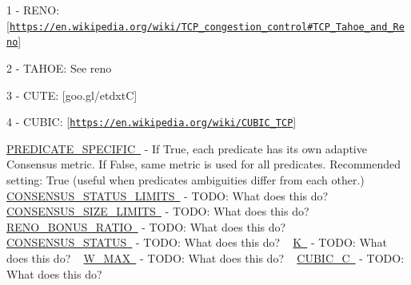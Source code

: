\begin{DoxyItemize}
\item 1 -\/ R\+E\+NO\+: \mbox{[}\href{https://en.wikipedia.org/wiki/TCP_congestion_control#TCP_Tahoe_and_Reno}{\tt https\+://en.\+wikipedia.\+org/wiki/\+T\+C\+P\+\_\+congestion\+\_\+control\#\+T\+C\+P\+\_\+\+Tahoe\+\_\+and\+\_\+\+Reno}\mbox{]}
\item 2 -\/ T\+A\+H\+OE\+: See reno
\item 3 -\/ C\+U\+TE\+: \mbox{[}goo.\+gl/etdxtC\mbox{]}
\item 4 -\/ C\+U\+B\+IC\+: \mbox{[}\href{https://en.wikipedia.org/wiki/CUBIC_TCP}{\tt https\+://en.\+wikipedia.\+org/wiki/\+C\+U\+B\+I\+C\+\_\+\+T\+CP}\mbox{]}
\end{DoxyItemize}

\mbox{\hyperlink{namespacedynamicfilterapp_1_1toggles_a2826a54e707f46fbd0fa2f8f6219ead7}{P\+R\+E\+D\+I\+C\+A\+T\+E\+\_\+\+S\+P\+E\+C\+I\+F\+IC }} -\/ If True, each predicate has its own adaptive Consensus metric. If False, same metric is used for all predicates. Recommended setting\+: True (useful when predicates\textquotesingle{} ambiguities differ from each other.) ~\newline
 \mbox{\hyperlink{namespacedynamicfilterapp_1_1toggles_a36cac18f3d673a6f2cd86c88127e41b9}{C\+O\+N\+S\+E\+N\+S\+U\+S\+\_\+\+S\+T\+A\+T\+U\+S\+\_\+\+L\+I\+M\+I\+TS }} -\/ T\+O\+DO\+: What does this do? ~\newline
 \mbox{\hyperlink{namespacedynamicfilterapp_1_1toggles_a1a20e4a8af9569eaef5eb5b23f07222b}{C\+O\+N\+S\+E\+N\+S\+U\+S\+\_\+\+S\+I\+Z\+E\+\_\+\+L\+I\+M\+I\+TS }} -\/ T\+O\+DO\+: What does this do? ~\newline
 \mbox{\hyperlink{namespacedynamicfilterapp_1_1toggles_a18fd240c30a7c4a6ee9df12436a744ab}{R\+E\+N\+O\+\_\+\+B\+O\+N\+U\+S\+\_\+\+R\+A\+T\+IO }} -\/ T\+O\+DO\+: What does this do? ~\newline
 \mbox{\hyperlink{namespacedynamicfilterapp_1_1toggles_a090eab76b7b0e234f422b87e30adf793}{C\+O\+N\+S\+E\+N\+S\+U\+S\+\_\+\+S\+T\+A\+T\+US }} -\/ T\+O\+DO\+: What does this do? ~\newline
 \mbox{\hyperlink{namespacedynamicfilterapp_1_1toggles_a2689c4b3931025b79053532a5f1b0a85}{K }} -\/ T\+O\+DO\+: What does this do? ~\newline
 \mbox{\hyperlink{namespacedynamicfilterapp_1_1toggles_add63171ca968cbd5ca4d60dfbf9a2746}{W\+\_\+\+M\+AX }} -\/ T\+O\+DO\+: What does this do? ~\newline
 \mbox{\hyperlink{namespacedynamicfilterapp_1_1toggles_a073a7aa1bc6b8c92d5682922759765fd}{C\+U\+B\+I\+C\+\_\+C }} -\/ T\+O\+DO\+: What does this do? ~\newline
